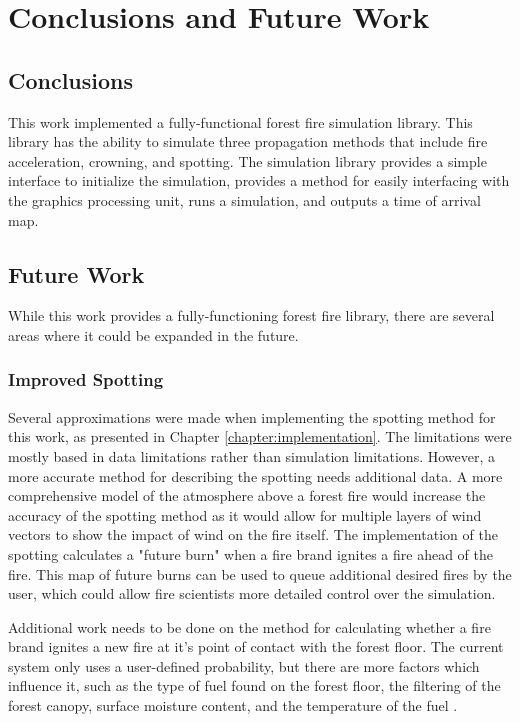 \chapter{Conclusions and Future Work}
\label{chapter:conclusions}

\section{Conclusions}
This work implemented a fully-functional forest fire simulation library. This library has the ability to simulate three propagation methods that include fire acceleration, crowning, and spotting. The simulation library provides a simple interface to initialize the simulation, provides a method for easily interfacing with the graphics processing unit, runs a simulation, and outputs a time of arrival map. 

\section{Future Work}
While this work provides a fully-functioning forest fire library, there are several areas where it could be expanded in the future. 

\subsection{Improved Spotting} 
Several approximations were made when implementing the spotting method for this work, as presented in Chapter \ref{chapter:implementation}. The limitations were mostly based in data limitations rather than simulation limitations. However, a more accurate method for describing the spotting needs additional data. A more comprehensive model of the atmosphere above a forest fire would increase the accuracy of the spotting method as it would allow for multiple layers of wind vectors to show the impact of wind on the fire itself. The implementation of the spotting calculates a "future burn" when a fire brand ignites a fire ahead of the fire. This map of future burns can be used to queue additional desired fires by the user, which could allow fire scientists more detailed control over the simulation. 

Additional work needs to be done on the method for calculating whether a fire brand ignites a new fire at it's point of contact with the forest floor. The current system only uses a user-defined probability, but there are more factors which influence it, such as the type of fuel found on the forest floor, the filtering of the forest canopy, surface moisture content, and the temperature of the fuel \cite{bradshaw1984}\cite{blackmarr1972}\cite{bunting1974}.


